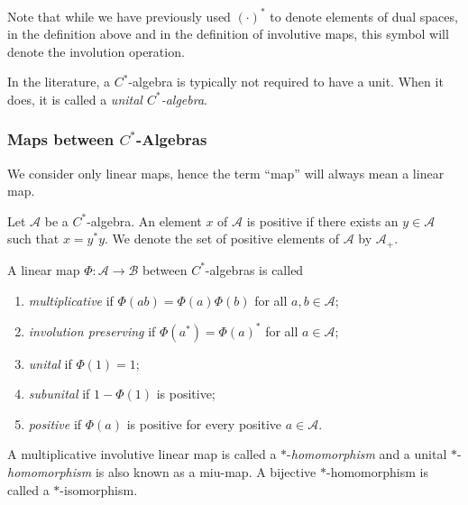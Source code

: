 Note that while we have previously used $(\cdot)^*$ to denote elements of dual spaces, in the definition above and in the definition of involutive maps, this symbol will denote the involution operation.

\begin{remark}  
  In the literature, a \( C^* \)-algebra is typically not required to have a unit. When it does, it is called a \emph{unital \( C^* \)-algebra}.
\end{remark}



\subsubsection{Maps between $C^*$-Algebras}

We consider only linear maps, hence the term ``map'' will always mean a linear map.


\begin{definition}
  Let $ \mathscr{A}$ be a \( C^* \)-algebra. An element $x$ of $ \mathscr{A}$ is  positive if there exists an $y \in  \mathscr{A}$ such that $x = y^* y$.
  We denote the set of positive elements of $ \mathscr{A}$ by $ \mathscr{A}_+$.
\end{definition}


\begin{definition}
 A linear map $\Phi: \mathscr{A} \to \mathscr{B}$ between $C^*$-algebras is called
\begin{enumerate}
    \item \emph{multiplicative} if $\Phi(ab) = \Phi(a)\Phi(b)$ for all $a, b \in \mathscr{A} $;
    \item \emph{involution preserving} if $\Phi(a^*) = \Phi(a)^*$ for all $a \in \mathscr{A} $;
    \item \emph{unital} if $\Phi(1) = 1$;
    \item \emph{subunital} if $1-\Phi(1)$ is positive;
    \item \emph{positive} if $\Phi(a)$ is positive for every positive $a \in \mathscr{A} $.
\end{enumerate}
A multiplicative involutive linear map is called a \(*\)-\emph{homomorphism} and a unital \(*\)-\emph{homomorphism} is also known as a \acrshort{miu}-map. A bijective \(*\)-homomorphism is called a \(*\)-isomorphism.
\end{definition}


